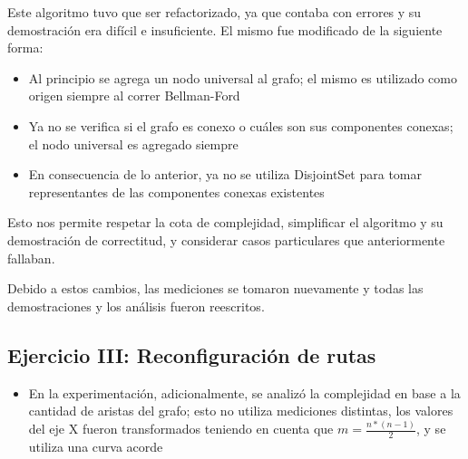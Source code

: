 		Este algoritmo tuvo que ser refactorizado, ya que contaba con errores y su demostración era difícil e insuficiente. El mismo fue modificado de la siguiente forma:
		
		\begin{itemize}
			\item Al principio se agrega un nodo universal al grafo; el mismo es utilizado como origen siempre al correr Bellman-Ford

			\item Ya no se verifica si el grafo es conexo o cuáles son sus componentes conexas; el nodo universal es agregado siempre

			\item En consecuencia de lo anterior, ya no se utiliza DisjointSet para tomar representantes de las componentes conexas existentes
		\end{itemize}

		Esto nos permite respetar la cota de complejidad, simplificar el algoritmo y su demostración de correctitud, y considerar casos particulares que anteriormente fallaban.

		Debido a estos cambios, las mediciones se tomaron nuevamente y todas las demostraciones y los análisis fueron reescritos.

	\subsection*{Ejercicio III: Reconfiguración de rutas}

	\begin{itemize}

		\item En la experimentación, adicionalmente, se analizó la complejidad en base a la cantidad de aristas del grafo; esto no utiliza mediciones distintas, los valores del eje X fueron transformados teniendo en cuenta que $m = \frac{n * (n - 1)}{2}$, y se utiliza una curva acorde

	\end{itemize}